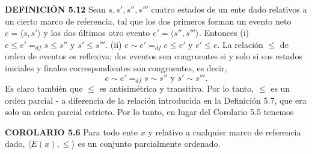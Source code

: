 \begin{justifying}
\textbf{DEFINICIÓN 5.12} Sean $s, s', s'', s'''$ cuatro estados de un ente dado relativos a un cierto marco de referencia, tal que los dos primeros forman un evento neto $e = \langle s, s' \rangle$ y los dos últimos otro evento $e'=\langle s'', s''' \rangle$. Entonces
(i) $e \le e' =_{df} s \le s'' \text{ y } s' \le s'''$.
(ii) $e \sim e' =_{df} e \le e' \text{ y } e' \le e$.
La relación $\le$ de orden de eventos es reflexiva; dos eventos son congruentes si y solo si sus estados iniciales y finales correspondientes son congruentes, es decir,
\[
e \sim e' =_{df} s \sim s'' \text{ y } s' \sim s'''.
\]
Es claro también que $\le$ es antisimétrica y transitiva. Por lo tanto, $\le$ es un orden parcial - a diferencia de la relación introducida en la Definición 5.7, que era solo un orden parcial estricto. Por lo tanto, en lugar del Corolario 5.5 tenemos

\textbf{COROLARIO 5.6} Para todo ente $x$ y relativo a cualquier marco de referencia dado, $\langle E(x), \le \rangle$ es un conjunto parcialmente ordenado.

\end{justifying}
